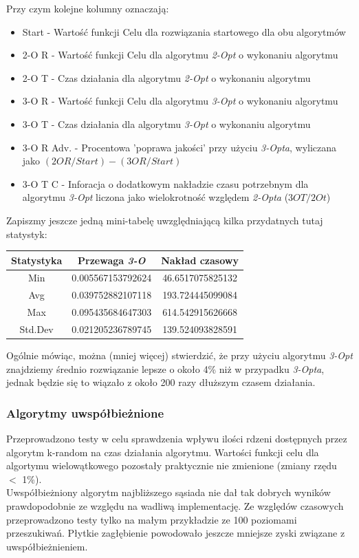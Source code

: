 \documentclass{article}
\begin{document}
Przy czym kolejne kolumny oznaczają:
\begin{itemize}
	\item Start - Wartość funkcji Celu dla rozwiązania startowego dla obu algorytmów
	\item 2-O R - Wartość funkcji Celu dla algorytmu \textit{2-Opt} o wykonaniu algorytmu
	\item 2-O T - Czas działania dla algorytmu \textit{2-Opt} o wykonaniu algorytmu
	\item 3-O R - Wartość funkcji Celu dla algorytmu \textit{3-Opt} o wykonaniu algorytmu
	\item 3-O T - Czas działania dla algorytmu \textit{3-Opt} o wykonaniu algorytmu
	\item 3-O R Adv. - Procentowa 'poprawa jakości' przy użyciu \textit{3-Opta}, wyliczana jako $(2OR/Start) - (3OR/Start)$
	\item 3-O T C - Inforacja o dodatkowym nakładzie czasu potrzebnym dla algorytmu \textit{3-Opt} liczona jako wielokrotność względem \textit{2-Opta} ($3OT / 2Ot$)
\end{itemize}

Zapiszmy jeszcze jedną mini-tabelę uwzględniającą kilka przydatnych tutaj statystyk:
\begin{table}[h!]
\centering
\begin{tabular}{c||c|c}
Statystyka & Przewaga \textit{3-O} & Nakład czasowy \\
\hline
Min & 0.005567153792624 & 46.6517075825132 \\
Avg & 0.039752882107118 & 193.724445099084 \\
Max & 0.095435684647303 & 614.542915626668 \\
Std.Dev & 0.021205236789745 & 139.524093828591 \\
\end{tabular}
\end{table}

Ogólnie mówiąc, można (mniej więcej) stwierdzić, że przy użyciu algorytmu \textit{3-Opt} znajdziemy średnio rozwiązanie lepsze o około 4\% niż w przypadku \textit{3-Opta}, jednak będzie się to wiązało z około 200 razy dłuższym czasem działania.

\newpage
\subsubsection{Algorytmy uwspółbieżnione}

Przeprowadzono testy w celu sprawdzenia wpływu ilości rdzeni dostępnych przez algorytm k-random na czas działania algorytmu. Wartości funkcji celu dla algortymu wielowątkowego pozostały praktycznie nie zmienione (zmiany rzędu $<$ 1\%).\\
Uwspółbieżniony algorytm najbliższego sąsiada nie dał tak dobrych wyników prawdopodobnie ze względu na wadliwą implementację. Ze względów czasowych przeprowadzono testy tylko na małym przykładzie ze 100 poziomami przeszukiwań. Płytkie zagłębienie powodowało jeszcze mniejsze zyski związane z uwspółbieżnieniem.
\end{document}
